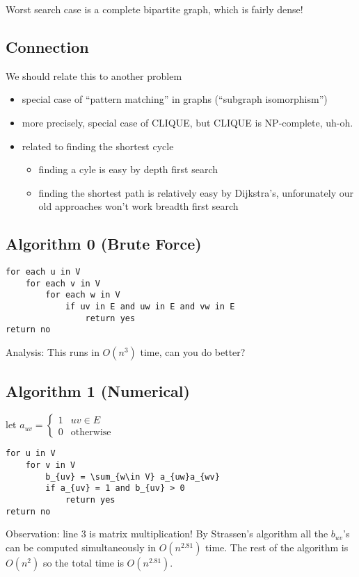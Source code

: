 \documentclass[english,12pt]{article}
\theoremstyle{plain}
\theoremstyle{definition}
\theoremstyle{definition} %
\begin{document}
Worst search case is a complete bipartite graph, which is fairly dense!

\subsection{Connection}
We should relate this to another problem
\begin{itemize}
\item special case of ``pattern matching'' in graphs (``subgraph isomorphism'')
\item more precisely, special case of CLIQUE, but CLIQUE is NP-complete, uh-oh.
\item related to finding the shortest cycle
\begin{itemize}
\item finding a cyle is easy by depth first search
\item finding the shortest path is relatively easy by Dijkstra's, unforunately our old approaches won't work breadth first search
\end{itemize}
\end{itemize}

\subsection{Algorithm 0 (Brute Force)}
\begin{verbatim}
for each u in V
    for each v in V
        for each w in V
            if uv in E and uw in E and vw in E
                return yes
return no
\end{verbatim}

Analysis:
This runs in $O(n^3)$ time, can you do better?


\subsection{Algorithm 1 (Numerical)}
let $a_{uv} = \begin{cases}1 & uv\in E\\
0 & \text{otherwise}\end{cases}$

\begin{verbatim}
for u in V
    for v in V
        b_{uv} = \sum_{w\in V} a_{uw}a_{wv}
        if a_{uv} = 1 and b_{uv} > 0
            return yes
return no
\end{verbatim}
Observation: line 3 is matrix multiplication!  By Strassen's algorithm all the $b_{uv}$'s can be computed simultaneously in $O(n^{2.81})$ time.  The rest of the algorithm is $O(n^2)$ so the total time is $O(n^{2.81})$.
\end{document}
